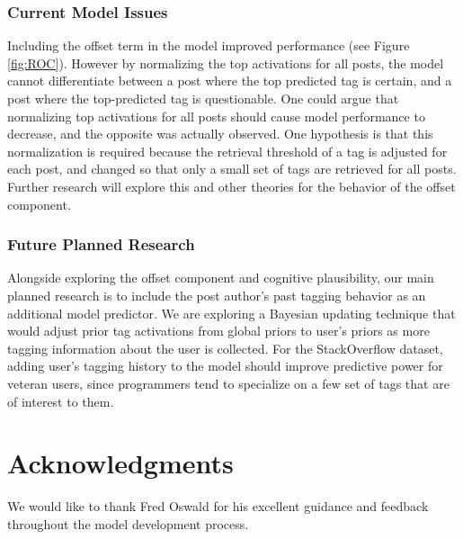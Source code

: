 \documentclass[10pt,letterpaper]{article}
\begin{document}
\subsubsection{Current Model Issues}

Including the offset term in the model improved performance (see Figure \ref{fig:ROC}).
However by normalizing the top activations for all posts, the model cannot differentiate between a post where the top predicted tag is certain, and a post where the top-predicted tag is questionable.
One could argue that normalizing top activations for all posts should cause model performance to decrease, and the opposite was actually observed.
One hypothesis is that this normalization is required because the retrieval threshold of a tag is adjusted for each post, and changed so that only a small set of tags are retrieved for all posts.
Further research will explore this and other theories for the behavior of the offset component.

\subsubsection{Future Planned Research}

Alongside exploring the offset component and cognitive plausibility, our main planned research is to include the post author's past tagging behavior as an additional model predictor.
We are exploring a Bayesian updating technique that would adjust prior tag activations from global priors to user's priors as more tagging information about the user is collected.
For the StackOverflow dataset, adding user's tagging history to the model should improve predictive power for veteran users,
since programmers tend to specialize on a few set of tags that are of interest to them.

\section{Acknowledgments}

We would like to thank Fred Oswald for his excellent guidance and feedback throughout the model development process.


\setlength{\bibleftmargin}{.125in}
\setlength{\bibindent}{-\bibleftmargin}

\end{document}
